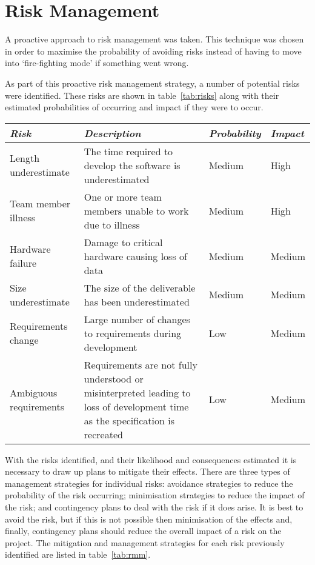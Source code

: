 \section{Risk Management}
\label{sec:risk}
 
A proactive approach to risk management was taken. This technique was chosen in order
to maximise the probability of avoiding risks instead of having to move into `fire-fighting mode'
if something went wrong.
 
As part of this proactive risk management strategy, a number of potential risks were identified.
These risks are shown in table~\ref{tab:risks} along with their estimated probabilities of occurring
and impact if they were to occur.
 
\begin{table*}
	\small
	\begin{tabular}{l p{} l l}
		\toprule
		\emph{Risk} & \emph{Description} & \emph{Probability} & \emph{Impact} \\
		\midrule
		Length underestimate & The time required to develop the software is underestimated & Medium & High \\
		Team member illness & One or more team members unable to work due to illness & Medium & High \\
		Hardware failure & Damage to critical hardware causing loss of data & Medium & Medium \\
		Size underestimate & The size of the deliverable has been underestimated & Medium & Medium \\
		Requirements change & Large number of changes to requirements during development & Low & Medium \\
		Ambiguous requirements & Requirements are not fully understood or misinterpreted leading to
			loss of development time as the specification is recreated & Low & Medium \\
		\bottomrule
	\end{tabular}
	\vspace{1.5em}
	\caption{Risk identification and analysis.}
	\label{tab:risks}
\end{table*}
 
With the risks identified, and their likelihood and consequences estimated it is necessary
to draw up plans to mitigate their effects. There are three types of management strategies 
for individual risks: avoidance strategies to reduce the probability of the risk occurring;
minimisation strategies to reduce the impact of the risk; and contingency plans to deal with
the risk if it does arise. It is best to avoid the risk,
but if this is not possible then minimisation of the effects and, finally, contingency plans
should reduce the overall impact of a risk on the project. The mitigation and management
strategies for each risk previously identified are listed in table~\ref{tab:rmm}.
 
